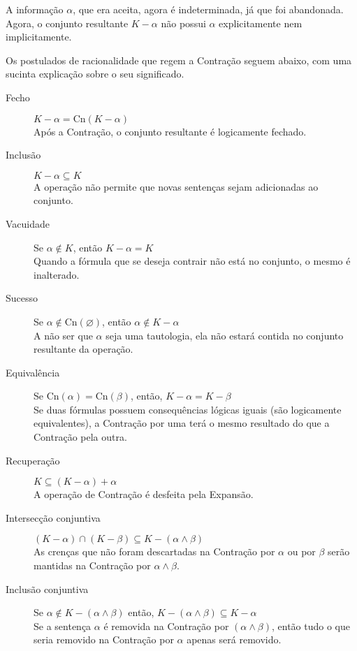 A informação $ \alpha $, que era aceita, agora é indeterminada, já que foi abandonada. Agora, o conjunto resultante $ K - \alpha $ não possui $ \alpha $ explicitamente nem implicitamente. 

Os postulados de racionalidade que regem a Contração seguem abaixo, com uma sucinta explicação sobre o seu significado.

\begin{description}
	\item[Fecho] $ K - \alpha = \text{Cn}(K - \alpha) $ \\ Após a Contração, o conjunto resultante é logicamente fechado.
	\item[Inclusão] $ K - \alpha \subseteq K$ \\ A operação não permite que novas sentenças sejam adicionadas ao conjunto.
	\item[Vacuidade] Se $ \alpha \notin K $, então $ K - \alpha = K $ \\ Quando a fórmula que se deseja contrair não está no conjunto, o mesmo é inalterado.
	\item[Sucesso] Se $ \alpha \notin \text{Cn}(\varnothing) $, então $ \alpha \notin K - \alpha $ \\ A não ser que $ \alpha $ seja uma tautologia, ela não estará contida no conjunto resultante da operação.
	\item[Equivalência] Se $ \text{Cn}(\alpha) = \text{Cn}(\beta) $, então, $ K - \alpha = K - \beta $ \\ Se duas fórmulas possuem consequências lógicas iguais (são logicamente equivalentes), a Contração por uma terá o mesmo resultado do que a Contração pela outra.
	\item[Recuperação] $ K \subseteq (K - \alpha) + \alpha $ \\ A operação de Contração é desfeita pela Expansão.
	\item[Intersecção conjuntiva] $ (K - \alpha) \cap (K - \beta) \subseteq K - (\alpha \land \beta) $ \\ As crenças que não foram descartadas na Contração por $ \alpha $ ou por $ \beta $ serão mantidas na Contração por $ \alpha \land \beta $.
	\item[Inclusão conjuntiva] Se $ \alpha \notin K - (\alpha \land \beta) $ então, $ K - (\alpha \land \beta) \subseteq K - \alpha $ \\ Se a sentença $ \alpha $ é removida na Contração por $  (\alpha \land \beta) $, então tudo o que seria removido na Contração por $ \alpha $ apenas será removido. 
\end{description}

